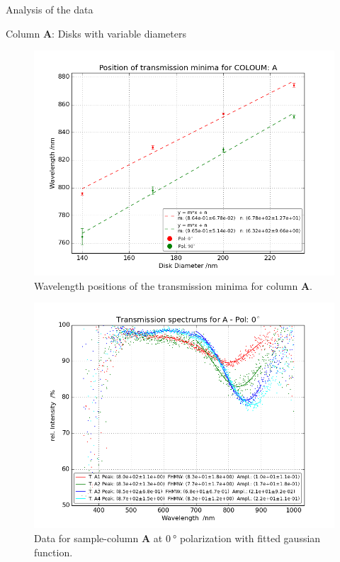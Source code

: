\documentclass[pdftex, a4paper,11pt, twoside, UKenglish]{report}
\begin{document}
\begin{chapter}{Analysis of the data}
\begin{section}{Column \textbf{A}: Disks with variable diameters}
      \begin{figure}[b!]
        \centering
        \includegraphics[width=\textwidth]{Figures/MinimaPosA.png}
        \caption{Wavelength positions of the transmission minima for column
            \textbf{A}.}
        \label{fig:MinimaPosA}
      \end{figure}
      \newpage
      \begin{figure}[ht!]
        \centering
        \begin{minipage}{.95\textwidth}
          \centering
          \includegraphics[width=\textwidth]
              {Figures/TransspecFIT_APol0.png}
          \caption{Data for sample-column \textbf{A} at $\SI{0}{\degree}$
              polarization with fitted gaussian function.}

\end{minipage}
\end{figure}
\end{section}
\end{chapter}
\end{document}
